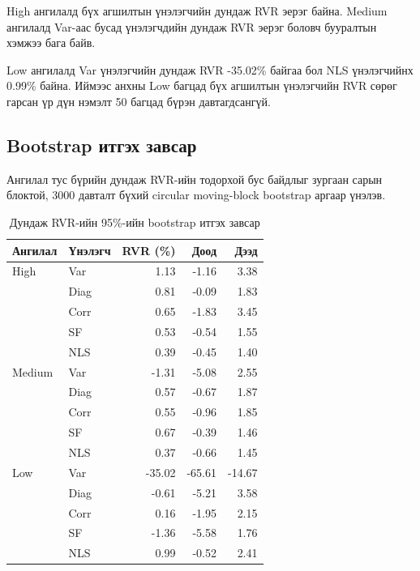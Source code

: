 High ангилалд бүх агшилтын үнэлэгчийн
дундаж RVR эерэг байна. Medium ангилалд
Var-аас бусад үнэлэгчдийн дундаж RVR
эерэг боловч бууралтын хэмжээ бага байв.

Low ангилалд Var үнэлэгчийн дундаж
RVR -35.02\% байгаа бол NLS үнэлэгчийнх
0.99\% байна. Иймээс анхны Low багцад
бүх агшилтын үнэлэгчийн RVR сөрөг
гарсан үр дүн нэмэлт 50 багцад
бүрэн давтагдсангүй.

\subsection{Bootstrap итгэх завсар}
\label{subsec:bootstrap_results}

Ангилал тус бүрийн дундаж RVR-ийн
тодорхой бус байдлыг зургаан сарын
блоктой, 3000 давталт бүхий circular
moving-block bootstrap аргаар үнэлэв.

\begin{table}[htbp]
	\centering
	\caption{Дундаж RVR-ийн 95\%-ийн bootstrap итгэх завсар}
	\label{tab:bootstrap_rvr}
	\small
	\begin{tabular}{llrrr}
		\hline
		Ангилал & Үнэлэгч &
		RVR (\%) & Доод & Дээд\\
		\hline
		High & Var  & 1.13 & -1.16 & 3.38\\
		& Diag & 0.81 & -0.09 & 1.83\\
		& Corr & 0.65 & -1.83 & 3.45\\
		& SF   & 0.53 & -0.54 & 1.55\\
		& NLS  & 0.39 & -0.45 & 1.40\\
		\hline
		Medium & Var  & -1.31 & -5.08 & 2.55\\
		& Diag & 0.57 & -0.67 & 1.87\\
		& Corr & 0.55 & -0.96 & 1.85\\
		& SF   & 0.67 & -0.39 & 1.46\\
		& NLS  & 0.37 & -0.66 & 1.45\\
		\hline
		Low & Var  & -35.02 & -65.61 & -14.67\\
		& Diag & -0.61 & -5.21 & 3.58\\
		& Corr & 0.16 & -1.95 & 2.15\\
		& SF   & -1.36 & -5.58 & 1.76\\
		& NLS  & 0.99 & -0.52 & 2.41\\
		\hline
	\end{tabular}
\end{table}

